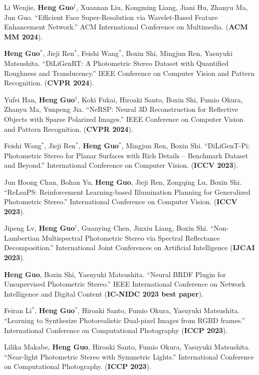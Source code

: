 \begin{enumerate}[label={[\arabic*]}]
	\item Li Wenjie, \textbf{Heng Guo}$^\dagger$, Xuannan Liu, Kongming Liang, Jiani Hu, Zhanyu Ma, Jun Guo. ``Efficient Face Super-Resolution via Wavelet-Based Feature Enhancement Network.'' ACM International Conference on Multimedia. (\textbf{ACM MM 2024}).
	\item \textbf{Heng Guo}$^*$, Jieji Ren$^*$, Feishi Wang$^*$, Boxin Shi, Mingjun Ren, Yasuyuki Matsushita. ``DiLiGenRT: A Photometric Stereo Dataset with Quantified Roughness and Translucency.'' IEEE Conference on Computer Vision and Pattern Recognition. (\textbf{CVPR 2024}).
	\item Yufei Han, \textbf{Heng Guo$^\dagger$}, Koki Fukai, Hiroaki Santo, Boxin Shi, Fumio Okura, Zhanyu Ma, Yunpeng Jia. ``NeRSP: Neural 3D Reconstruction for Reflective Objects with Sparse Polarized Images.'' IEEE Conference on Computer Vision and Pattern Recognition. (\textbf{CVPR 2024}).
	\item Feishi Wang$^*$, Jieji Ren$^*$, \textbf{Heng Guo}$^*$, Mingjun Ren, Boxin Shi. ``DiLiGenT-Pi: Photometric Stereo for Planar Surfaces with Rich Details – Benchmark Dataset and Beyond.'' International Conference on Computer Vision. (\textbf{ICCV 2023}).
	\item Jun Hoong Chan, Bohan Yu, \textbf{Heng Guo}, Jieji Ren, Zongqing Lu, Boxin Shi. ``ReLeaPS: Reinforcement Learning-based Illumination Planning for Generalized Photometric Stereo.'' International Conference on Computer Vision. (\textbf{ICCV 2023}).
	\item Jipeng Lv, \textbf{Heng Guo$^{\dagger}$}, Guanying Chen, Jinxiu Liang, Boxin Shi. ``Non-Lambertian Multispectral Photometric Stereo via Spectral Reflectance Decomposition.'' International Joint Conferences on Artificial Intelligence (\textbf{IJCAI 2023}).
	\item \textbf{Heng Guo}, Boxin Shi, Yasuyuki Matsushita. ``Neural BRDF Plugin for Unsupervised Photometric Stereo.'' IEEE International Conference on Network Intelligence and Digital Content (\textbf{IC-NIDC 2023 best paper}).
	\item Feiran Li$^*$, \textbf{Heng Guo}$^*$, Hiroaki Santo, Fumio Okura, Yasuyuki Matsushita. ``Learning to Synthesize Photorealistic Dual-pixel Images from RGBD frames.'' International Conference on Computational Photography (\textbf{ICCP 2023}).
	\item Lilika Makabe, \textbf{Heng Guo}, Hiroaki Santo, Fumio Okura, Yasuyuki Matsushita. ``Near-light Photometric Stereo with Symmetric Lights.'' International Conference on Computational Photography. (\textbf{ICCP 2023}).

\end{enumerate}
